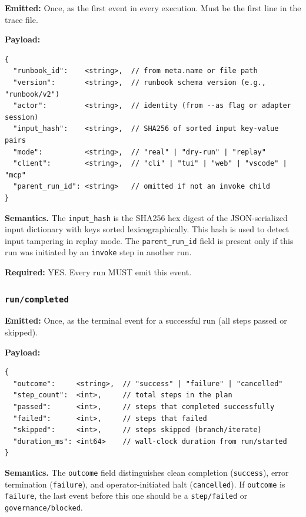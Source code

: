 \textbf{Emitted:} Once, as the first event in every execution. Must be the first line in the trace file.

\textbf{Payload:}
\begin{verbatim}
{
  "runbook_id":    <string>,  // from meta.name or file path
  "version":       <string>,  // runbook schema version (e.g., "runbook/v2")
  "actor":         <string>,  // identity (from --as flag or adapter session)
  "input_hash":    <string>,  // SHA256 of sorted input key-value pairs
  "mode":          <string>,  // "real" | "dry-run" | "replay"
  "client":        <string>,  // "cli" | "tui" | "web" | "vscode" | "mcp"
  "parent_run_id": <string>   // omitted if not an invoke child
}
\end{verbatim}

\textbf{Semantics.} The \texttt{input\_hash} is the SHA256 hex digest of the JSON-serialized input dictionary with keys sorted lexicographically. This hash is used to detect input tampering in replay mode. The \texttt{parent\_run\_id} field is present only if this run was initiated by an \texttt{invoke} step in another run.

\textbf{Required:} YES. Every run MUST emit this event.


\subsubsection{\texttt{run/completed}}

\textbf{Emitted:} Once, as the terminal event for a successful run (all steps passed or skipped).

\textbf{Payload:}
\begin{verbatim}
{
  "outcome":     <string>,  // "success" | "failure" | "cancelled"
  "step_count":  <int>,     // total steps in the plan
  "passed":      <int>,     // steps that completed successfully
  "failed":      <int>,     // steps that failed
  "skipped":     <int>,     // steps skipped (branch/iterate)
  "duration_ms": <int64>    // wall-clock duration from run/started
}
\end{verbatim}

\textbf{Semantics.} The \texttt{outcome} field distinguishes clean completion (\texttt{success}), error termination (\texttt{failure}), and operator-initiated halt (\texttt{cancelled}). If \texttt{outcome} is \texttt{failure}, the last event before this one should be a \texttt{step/failed} or \texttt{governance/blocked}.

